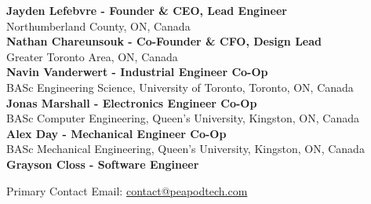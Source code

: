 \scriptsize{
    \textbf{Jayden Lefebvre - Founder \& CEO, Lead Engineer}\\
    Northumberland County, ON, Canada\\
    \vspace{.5cm}
    \textbf{Nathan Chareunsouk - Co-Founder \& CFO, Design Lead}\\Greater Toronto Area, ON, Canada\\
    \vspace{.5cm}
    \textbf{Navin Vanderwert - Industrial Engineer Co-Op}\\
    BASc Engineering Science, University of Toronto, Toronto, ON, Canada\\
    \vspace{.5cm}
    \textbf{Jonas Marshall - Electronics Engineer Co-Op}\\
    BASc Computer Engineering, Queen's University, Kingston, ON, Canada\\
    \vspace{.5cm}
    \textbf{Alex Day - Mechanical Engineer Co-Op}\\
    BASc Mechanical Engineering, Queen's University, Kingston, ON, Canada\\
    \textbf{Grayson Closs - Software Engineer}\\
}

\vspace{.75cm}

Primary Contact Email: \uline{contact@peapodtech.com}